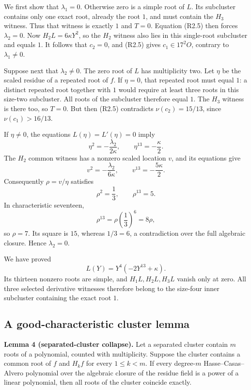 \documentclass[
  british,
  10pt,
  a4paper,
]{article}
\begin{document}
We first show that \(\lambda_1=0\). Otherwise zero is a simple root of
\(L\). Its subcluster contains only one exact root, already the root
\(1\), and must contain the \(H_3\) witness. Thus that witness is
exactly \(1\) and \(T=0\). Equation (R2.5) then forces \(\lambda_2=0\).
Now \(H_2L=6\kappa Y^2\), so the \(H_2\) witness also lies in this
single-root subcluster and equals \(1\). It follows that \(c_2=0\), and
(R2.5) gives \(c_1\in17^2O\), contrary to \(\lambda_1\ne0\).

Suppose next that \(\lambda_2\ne0\). The zero root of \(L\) has
multiplicity two. Let \(\eta\) be the scaled residue of a repeated root
of \(f\). If \(\eta=0\), that repeated root must equal \(1\): a distinct
repeated root together with \(1\) would require at least three roots in
this size-two subcluster. All roots of the subcluster therefore equal
\(1\). The \(H_3\) witness is there too, so \(T=0\). But then (R2.5)
contradicts \(\nu(c_2)=15/13\), since \(\nu(c_1)>16/13\).

If \(\eta\ne0\), the equations \(L(\eta)=L'(\eta)=0\) imply \[
\eta^2=-\frac{\lambda_2}{2\kappa},
\qquad
\eta^{13}=-\frac{\kappa}{2}.
\] The \(H_2\) common witness has a nonzero scaled location \(v\), and
its equations give \[
v^2=-\frac{\lambda_2}{6\kappa},
\qquad
v^{13}=-\frac{5\kappa}{2}.
\] Consequently \(\rho=v/\eta\) satisfies \[
\rho^2=\frac13,
\qquad \rho^{13}=5.
\] In characteristic seventeen, \[
\rho^{13}=\rho\left(\frac13\right)^6=8\rho,
\] so \(\rho=7\). Its square is \(15\), whereas \(1/3=6\), a
contradiction over the full algebraic closure. Hence \(\lambda_2=0\).

We have proved \[
L(Y)=Y^4(-2Y^{13}+\kappa).
\tag{R2.9}
\] Its thirteen nonzero roots are simple, and \(H_1L,H_2L,H_3L\) vanish
only at zero. All three selected derivative witnesses therefore belong
to the size-four inner subcluster containing the exact root \(1\).

\subsection{A good-characteristic cluster
lemma}\label{a-good-characteristic-cluster-lemma}

\textbf{Lemma 4 (separated-cluster collapse).} Let a separated cluster
contain \(m\) roots of a polynomial, counted with multiplicity. Suppose
the cluster contains a common root of \(f\) and \(H_kf\) for every
\(1\le k<m\). If every degree-\(m\) Hasse--Casas--Alvero polynomial over
the algebraic closure of the residue field is a power of a linear
polynomial, then all roots of the cluster coincide exactly.
\end{document}
